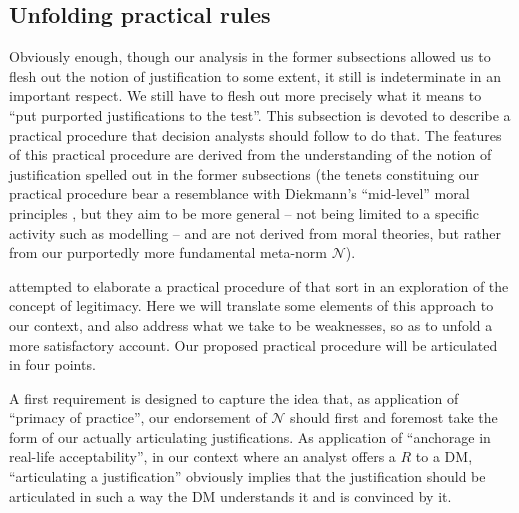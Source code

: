 \documentclass[preprint, french, english, 11pt, authoryear]{elsarticle}%
\newcommand{\adv}{\mathscr{N}}
\begin{document}
\subsection{Unfolding practical rules}
Obviously enough, though our analysis in the former subsections allowed us to flesh out the notion of justification to some extent, it still is indeterminate in an important respect. We still have to flesh out more precisely what it means to ``put purported justifications to the test''. This subsection is devoted to describe a practical procedure that decision analysts should follow to do that. The features of this practical procedure are derived from the understanding of the notion of justification spelled out in the former subsections (the tenets constituing our practical procedure bear a resemblance with Diekmann's ``mid-level'' moral principles \citep{diekmann_moral_2013}, but they aim to be more general -- not being limited to a specific activity such as modelling -- and are not derived from moral theories, but rather from our purportedly more fundamental  meta-norm $\mathscr{N}$).

\citet{meinard_what_2017} attempted to elaborate a practical procedure of that sort in an exploration of the concept of legitimacy. Here we will translate some elements of this approach to our context, and also address what we take to be weaknesses, so as to unfold a more satisfactory account. Our proposed practical procedure will be articulated in four points.

A first requirement is designed to capture the idea that, as application of “primacy of practice”, our endorsement of $\adv$ should first and foremost take the form of our actually articulating justifications. As application of ``anchorage in real-life acceptability'', in our context where an analyst offers a $R$ to a \ac{DM}, ``articulating a justification'' obviously implies that the justification should be articulated in such a way the \ac{DM} understands it and is convinced by it.
\end{document}
